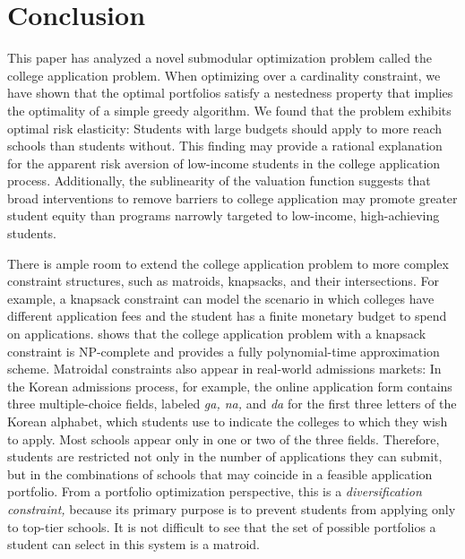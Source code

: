 \section{Conclusion} \label{sectionConclusion}

This paper has analyzed a novel submodular optimization problem called the college application problem. When optimizing over a cardinality constraint, we have shown that the optimal portfolios satisfy a nestedness property that implies the optimality of a simple greedy algorithm. We found that the problem exhibits optimal risk elasticity: Students with large budgets should apply to more reach schools than students without. This finding may provide a rational explanation for the apparent risk aversion of low-income students in the college application process. Additionally, the sublinearity of the valuation function suggests that broad interventions to remove barriers to college application may promote greater student equity than programs narrowly targeted to low-income, high-achieving students.

There is ample room to extend the college application problem to more complex constraint structures, such as matroids, knapsacks, and their intersections. For example, a knapsack constraint can model the scenario in which colleges have different application fees and the student has a finite monetary budget to spend on applications. \cite{kapur2022} shows that the college application problem with a knapsack constraint is NP-complete and provides a fully polynomial-time approximation scheme. Matroidal constraints also appear in real-world admissions markets: In the Korean admissions process, for example, the online application form contains three multiple-choice fields, labeled \emph{ga, na,} and \emph{da} for the first three letters of the Korean alphabet, which students use to indicate the colleges to which they wish to apply. Most schools appear only in one or two of the three fields. Therefore, students are restricted not only in the number of applications they can submit, but in the combinations of schools that may coincide in a feasible application portfolio. From a portfolio optimization perspective, this is a \emph{diversification constraint,} because its primary purpose is to prevent students from applying only to top-tier schools. It is not difficult to see that the set of possible portfolios a student can select in this system is a matroid.

